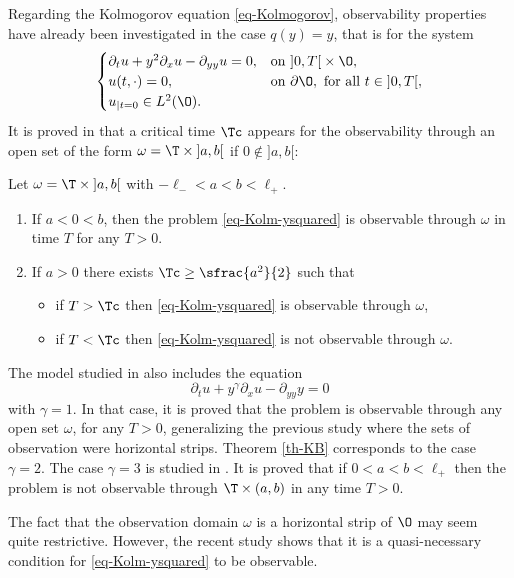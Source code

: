 Regarding the Kolmogorov equation \eqref{eq-Kolmogorov}, observability properties have already been investigated in the
case $q(y) = y$, that is for the system
\begin{equation} \label{eq-Kolm-ysquared}
\begin{cases}
\partial_t u + y^2 \partial_x u - \partial_{yy} u = 0, & \text{on } ]0,T[{}\times \O,\\
u(t,\cdot) = 0, & \text{on } \partial\O, \text{ for all } t \in{}]0,T[,\\
u_{|t=0} \in L^2 (\O).
\end{cases}
\end{equation}
It is proved in \cite{Beauchard14} that a critical time $\Tc$ appears for the observability through an open set of the form $\omega = \T\times{}]a,b[$ if $0 \notin{}]a,b[$:

\begin{theorem} \label{th-KB}
Let $\omega = \T \times{}]a,b[$ with $-\ell_- < a < b< \ell_+$.
\begin{enumerate}
\item If $a < 0 < b$, then the problem \eqref{eq-Kolm-ysquared} is observable through $\omega$ in time $T$ for any $T>0$.
\item If $a > 0$ there exists $\Tc \geq \sfrac{a^2}{2}$ such that
\begin{itemize}
\item if $T > \Tc$ then \eqref{eq-Kolm-ysquared} is observable through $\omega$,
\item if $T < \Tc$ then \eqref{eq-Kolm-ysquared} is not observable through $\omega$.
\end{itemize}
\end{enumerate}
\end{theorem}

The model studied in \cite{Beauchard14} also includes the equation
\[
\partial_t u + y^\gamma \partial_{x} u - \partial_{yy} y = 0
\]
with $\gamma = 1$. In that case, it is proved that the problem is observable through any open set $\omega$, for any $T > 0$, generalizing the previous study \cite{Beauchard_Zuazua_09} where the sets of observation were horizontal strips. Theorem \ref{th-KB} corresponds to the case $\gamma = 2$. The case $\gamma = 3$ is studied in \cite{beauchard_henry}. It is proved that if $0<a<b< \ell_+$ then the problem is not observable through $\T \times (a,b)$ in any time $T>0$.

The fact that the observation domain $\omega$ is a horizontal strip of $\O$ may seem quite restrictive. However,
the recent study \cite{koenig18} shows that it is a quasi-necessary condition for \eqref{eq-Kolm-ysquared} to be observable.

